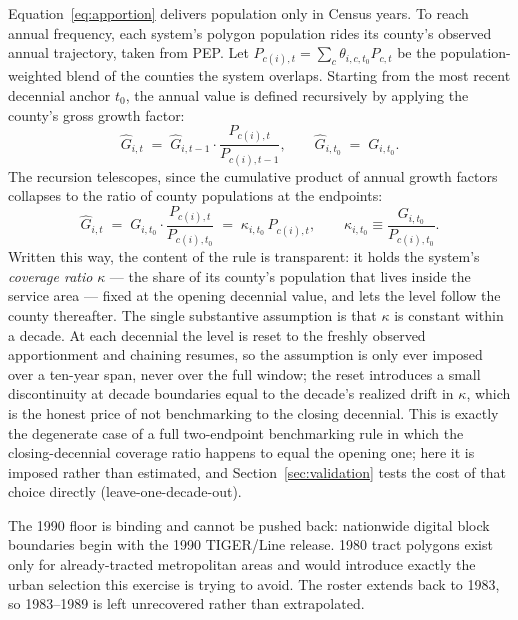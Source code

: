 \documentclass[11pt]{article}
\begin{document}
Equation~\eqref{eq:apportion} delivers population only in Census years. To
reach annual frequency, each system's polygon population rides its county's
observed annual trajectory, taken from PEP. Let
$P_{c(i),t}=\sum_c \theta_{i,c,t_0} P_{c,t}$ be the population-weighted blend
of the counties the system overlaps. Starting from the most recent decennial
anchor $t_0$, the annual value is defined recursively by applying the
county's gross growth factor:
\begin{equation}
\hat G_{i,t} \;=\; \hat G_{i,t-1}\cdot\frac{P_{c(i),t}}{P_{c(i),t-1}},
\qquad
\hat G_{i,t_0} \;=\; G_{i,t_0} .
\label{eq:chain}
\end{equation}
The recursion telescopes, since the cumulative product of annual growth
factors collapses to the ratio of county populations at the endpoints:
\begin{equation}
\hat G_{i,t} \;=\; G_{i,t_0}\cdot\frac{P_{c(i),t}}{P_{c(i),t_0}}
  \;=\; \kappa_{i,t_0}\,P_{c(i),t},
\qquad
\kappa_{i,t_0} \equiv \frac{G_{i,t_0}}{P_{c(i),t_0}} .
\label{eq:chain-closed}
\end{equation}
Written this way, the content of the rule is transparent: it holds the
system's \emph{coverage ratio} $\kappa$ --- the share of its county's
population that lives inside the service area --- fixed at the opening
decennial value, and lets the level follow the county thereafter. The single
substantive assumption is that $\kappa$ is constant within a decade. At each
decennial the level is reset to the freshly observed apportionment and
chaining resumes, so the assumption is only ever imposed over a ten-year span,
never over the full window; the reset introduces a small discontinuity at
decade boundaries equal to the decade's realized drift in $\kappa$, which is
the honest price of not benchmarking to the closing decennial. This is exactly
the degenerate case of a full two-endpoint benchmarking rule in which the
closing-decennial coverage ratio happens to equal the opening one; here it is
imposed rather than estimated, and Section~\ref{sec:validation} tests the cost
of that choice directly (leave-one-decade-out).

The 1990 floor is binding and cannot be pushed back: nationwide digital block
boundaries begin with the 1990 TIGER/Line release. 1980 tract polygons exist
only for already-tracted metropolitan areas and would introduce exactly the
urban selection this exercise is trying to avoid. The roster extends back to
1983, so 1983--1989 is left unrecovered rather than extrapolated.
\end{document}

